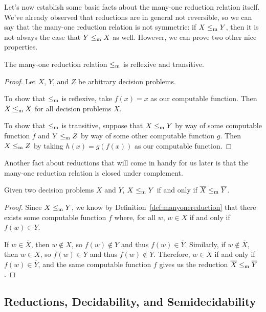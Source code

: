 Let's now establish some basic facts about the many-one reduction relation itself. We've already observed that reductions are in general not reversible, so we can say that the many-one reduction relation is not symmetric: if $X \leq_{\mathrm{m}} Y$, then it is not always the case that $Y \leq_{\mathrm{m}} X$ as well. However, we can prove two other nice properties.

\begin{lemma}\label{lem:manyonereductionreflexivetransitive}
The many-one reduction relation $\leq_{\mathrm{m}}$ is reflexive and transitive.

\begin{proof}
Let $X$, $Y$, and $Z$ be arbitrary decision problems.

To show that $\leq_{\mathrm{m}}$ is reflexive, take $f(x) = x$ as our computable function. Then $X \leq_{\mathrm{m}} X$ for all decision problems $X$.

To show that $\leq_{\mathrm{m}}$ is transitive, suppose that $X \leq_{\mathrm{m}} Y$ by way of some computable function $f$ and $Y \leq_{\mathrm{m}} Z$ by way of some other computable function $g$. Then $X \leq_{\mathrm{m}} Z$ by taking $h(x) = g(f(x))$ as our computable function.
\end{proof}
\end{lemma}

Another fact about reductions that will come in handy for us later is that the many-one reduction relation is closed under complement.

\begin{lemma}\label{lem:manyonereductioncomplement}
Given two decision problems $X$ and $Y$, $X \leq_{\mathrm{m}} Y$ if and only if $\overline{X} \leq_{\mathrm{m}} \overline{Y}$.

\begin{proof}
Since $X \leq_{\mathrm{m}} Y$, we know by Definition~\ref{def:manyonereduction} that there exists some computable function $f$ where, for all $w$, $w \in X$ if and only if $f(w) \in Y$.

If $w \in \overline{X}$, then $w \not\in X$, so $f(w) \not\in Y$ and thus $f(w) \in \overline{Y}$. Similarly, if $w \not\in \overline{X}$, then $w \in X$, so $f(w) \in Y$ and thus $f(w) \not\in \overline{Y}$. Therefore, $w \in \overline{X}$ if and only if $f(w) \in \overline{Y}$, and the same computable function $f$ gives us the reduction $\overline{X} \leq_{\mathrm{m}} \overline{Y}$.
\end{proof}
\end{lemma}

\subsection{Reductions, Decidability, and Semidecidability}

